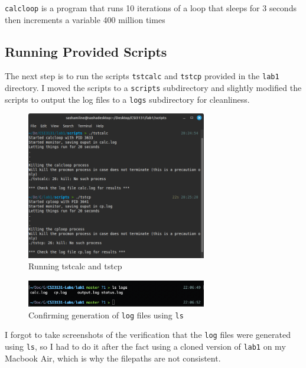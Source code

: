 \noindent
\texttt{calcloop} is a program that runs 10 iterations of a loop that sleeps
for 3 seconds then increments a variable 400 million times

\subsection{Running Provided Scripts}\label{subsec:running-provided-scripts}
The next step is to run the scripts \texttt{tstcalc} and \texttt{tstcp} provided
in the \texttt{lab1} directory.
I moved the scripts to a \texttt{scripts} subdirectory and slightly modified the
scripts to output the log files to a \texttt{logs} subdirectory for cleanliness.
\begin{figure}[H]
    \centering
    \includegraphics[width=0.7\textwidth]{../../screenshots/step7-scripts}
    \caption{Running tstcalc and tstcp}
    \label{fig:step7-scripts}
\end{figure}
\begin{figure}[H]
    \centering
    \includegraphics[width=0.7\textwidth]{../../screenshots/step7-ls}
    \caption{Confirming generation of \texttt{log} files using \texttt{ls}}
    \label{fig:step7-ls}
\end{figure}
\noindent
I forgot to take screenshots of the verification that the \texttt{log} files
were generated using \texttt{ls}, so I had to do it after the fact using a cloned
version of \texttt{lab1} on my Macbook Air, which is why the filepaths are not consistent.

